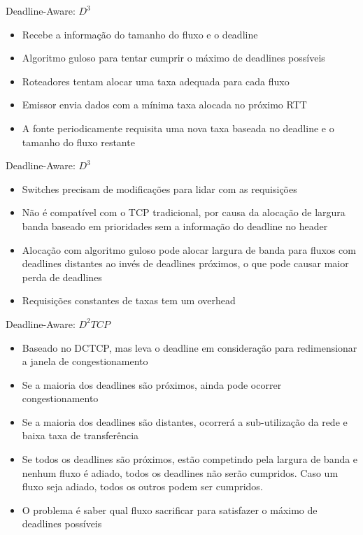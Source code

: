 \documentclass[aspectratio=169]{beamer}
\begin{document}
    \begin{frame} {Deadline-Aware: $D^3$}
		\begin{itemize}
		 	\item
		 		Recebe a informação do tamanho do fluxo e o deadline
		 	\item
				Algoritmo guloso para tentar cumprir o máximo de deadlines possíveis
		 	\item
				Roteadores tentam alocar uma taxa adequada para cada fluxo
		 	\item
				Emissor envia dados com a mínima taxa alocada no próximo RTT
		 	\item
				A fonte periodicamente requisita uma nova taxa baseada no deadline e o tamanho do fluxo restante
		 \end{itemize}
	\end{frame}

	\begin{frame} {Deadline-Aware: $D^3$}
		\begin{itemize}
		 	\item
		 		Switches precisam de modificações para lidar com as requisições
		 	\item
				Não é compatível com o TCP tradicional, por causa da alocação de largura banda baseado em prioridades sem a informação do deadline no header
		 	\item
				Alocação com algoritmo guloso pode alocar largura de banda para fluxos com deadlines distantes ao invés de deadlines próximos, o que pode causar maior perda de deadlines
		 	\item
				Requisições constantes de taxas tem um overhead
		 \end{itemize}
	\end{frame}

	\begin{frame} {Deadline-Aware: $D^2TCP$}
		\begin{itemize}
		 	\item
		 		Baseado no DCTCP, mas leva o deadline em consideração para redimensionar a janela de congestionamento
		 	\item
				Se a maioria dos deadlines são próximos, ainda pode ocorrer congestionamento
		 	\item
				Se a maioria dos deadlines são distantes, ocorrerá a sub-utilização da rede e baixa taxa de transferência
		 	\item
				Se todos os deadlines são próximos, estão competindo pela largura de banda e nenhum fluxo é adiado, todos os deadlines não serão cumpridos. Caso um fluxo seja adiado, todos os outros podem ser cumpridos.
		 	\item
				O problema é saber qual fluxo sacrificar para satisfazer o máximo de deadlines possíveis
		 \end{itemize}
	\end{frame}
\end{document}
